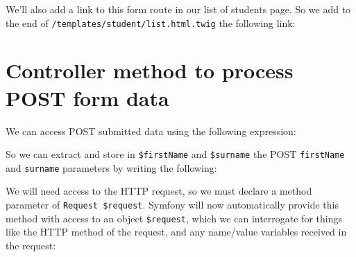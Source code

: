 \documentclass[a4paperpaper,openright]{book}
\newenvironment{Shaded}{}{}
\newcommand{\KeywordTok}[1]{\textcolor[rgb]{0.00,0.44,0.13}{\textbf{#1}}}
\newcommand{\NormalTok}[1]{#1}
\newcommand{\OtherTok}[1]{\textcolor[rgb]{0.00,0.44,0.13}{#1}}
\newcommand{\StringTok}[1]{\textcolor[rgb]{0.25,0.44,0.63}{#1}}
\begin{document}
We'll also add a link to this form route in our list of students page.
So we add to the end of \texttt{/templates/student/list.html.twig} the
following link:

\begin{Shaded}
\end{Shaded}

\hypertarget{controller-method-to-process-post-form-data}{%
\section{Controller method to process POST form
data}\label{controller-method-to-process-post-form-data}}

We can access POST submitted data using the following expression:

\begin{Shaded}
\end{Shaded}

So we can extract and store in \texttt{\$firstName} and
\texttt{\$surname} the POST \texttt{firstName} and \texttt{surname}
parameters by writing the following:

\begin{Shaded}
\end{Shaded}

We will need access to the HTTP request, so we must declare a method
parameter of \texttt{Request\ \$request}. Symfony will now automatically
provide this method with access to an object \texttt{\$request}, which
we can interrogate for things like the HTTP method of the request, and
any name/value variables received in the request:
\end{document}
